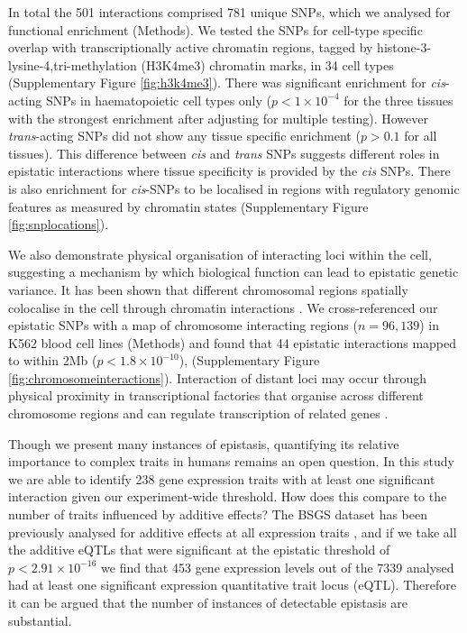 \documentclass{article}
\begin{document}
In total the 501 interactions comprised 781 unique SNPs, which we analysed for functional enrichment (Methods). We tested the SNPs for cell-type specific overlap with transcriptionally active chromatin regions, tagged by histone-3-lysine-4,tri-methylation (H3K4me3) chromatin marks, in 34 cell types \cite{Trynka2013} (Supplementary Figure \ref{fig:h3k4me3}). There was significant enrichment for \emph{cis}-acting SNPs in haematopoietic cell types only ($p < 1 \times 10^{-4}$ for the three tissues with the strongest enrichment after adjusting for multiple testing). However \emph{trans}-acting SNPs did not show any tissue specific enrichment ($p > 0.1$ for all tissues). This difference between \emph{cis} and \emph{trans} SNPs suggests different roles in epistatic interactions where tissue specificity is provided by the \emph{cis} SNPs. There is also enrichment for \emph{cis}-SNPs to be localised in regions with regulatory genomic features as measured by chromatin states \cite{Hoffman2012} (Supplementary Figure \ref{fig:snplocations}).

We also demonstrate physical organisation of interacting loci within the cell, suggesting a mechanism by which biological function can lead to epistatic genetic variance. It has been shown that different chromosomal regions spatially colocalise in the cell through chromatin interactions \cite{Lieberman-Aiden2009}. We cross-referenced our epistatic SNPs with a map of chromosome interacting regions ($n = 96,139$) in K562 blood cell lines \cite{Lan2012} (Methods) and found that 44 epistatic interactions mapped to within 2Mb ($p < 1.8 \times 10^{-10}$), (Supplementary Figure \ref{fig:chromosomeinteractions}). Interaction of distant loci may occur through physical proximity in transcriptional factories that organise across different chromosome regions and can regulate transcription of related genes \cite{Osborne2004, Rieder2012}.


Though we present many instances of epistasis, quantifying its relative importance to complex traits in humans remains an open question. In this study we are able to identify 238 gene expression traits with at least one significant interaction given our experiment-wide threshold. How does this compare to the number of traits influenced by additive effects? The BSGS dataset has been previously analysed for additive effects at all expression traits \cite{Powell2012}, and if we take all the additive eQTLs that were significant at the epistatic threshold of $p < 2.91 \times 10^{-16}$ we find that 453 gene expression levels out of the 7339 analysed had at least one significant expression quantitative trait locus (eQTL). Therefore it can be argued that the number of instances of detectable epistasis are substantial.
\end{document}
